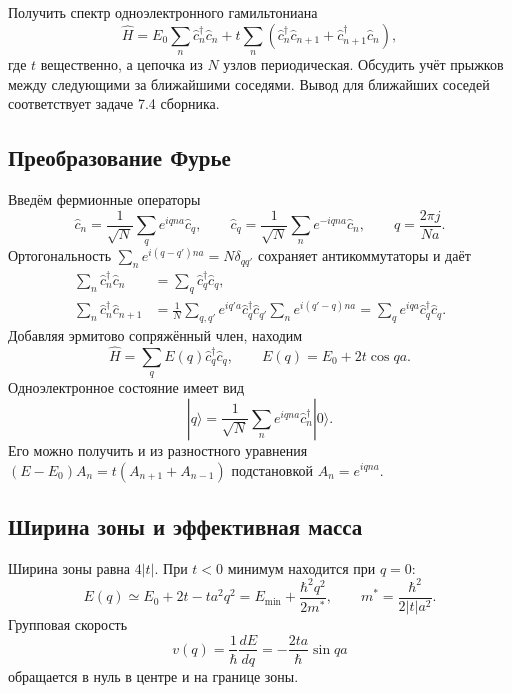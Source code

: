 \documentclass[../final.tex]{subfiles}
\begin{document}
\begingroup
\renewcommand{\thesection}{\arabic{section}}
\label{task:fksv_tight_binding}

\condition
Получить спектр одноэлектронного гамильтониана
\[
    \hat H=E_0\sum_n\hat c_n^\dagger\hat c_n
       +t\sum_n(\hat c_n^\dagger\hat c_{n+1}
                         +\hat c_{n+1}^\dagger\hat c_n),
\]
где $t$ вещественно, а цепочка из $N$ узлов периодическая.
Обсудить учёт прыжков между следующими за ближайшими соседями.
Вывод для ближайших соседей соответствует задаче 7.4 сборника.

\solution

\subsection*{Преобразование Фурье}

Введём фермионные операторы
\[
    \hat c_n=\frac1{\sqrt N}\sum_q e^{iqna}\hat c_q,
    \qquad
    \hat c_q=\frac1{\sqrt N}\sum_n e^{-iqna}\hat c_n,
    \qquad q=\frac{2\pi j}{Na}.
\]
Ортогональность $\sum_n e^{i(q-q')na}=N\delta_{qq'}$
сохраняет антикоммутаторы и даёт
\begin{align*}
    \sum_n\hat c_n^\dagger\hat c_n
       &=\sum_q\hat c_q^\dagger\hat c_q,\\
    \sum_n\hat c_n^\dagger\hat c_{n+1}
       &=\frac1N\sum_{q,q'}e^{iq'a}
          \hat c_q^\dagger\hat c_{q'}\sum_ne^{i(q'-q)na}
         =\sum_qe^{iqa}\hat c_q^\dagger\hat c_q.
\end{align*}
Добавляя эрмитово сопряжённый член, находим
\[
    \hat H=\sum_q E(q)\hat c_q^\dagger\hat c_q,
    \qquad E(q)=E_0+2t\cos qa.
\]
Одноэлектронное состояние имеет вид
\[
    |q\rangle=\frac1{\sqrt N}\sum_n e^{iqna}\hat c_n^\dagger|0\rangle.
\]
Его можно получить и из разностного уравнения
$(E-E_0)A_n=t(A_{n+1}+A_{n-1})$ подстановкой $A_n=e^{iqna}$.

\subsection*{Ширина зоны и эффективная масса}

Ширина зоны равна $4|t|$. При $t<0$ минимум находится при $q=0$:
\[
    E(q)\simeq E_0+2t-ta^2q^2
       =E_{\min}+\frac{\hbar^2q^2}{2m^*},\qquad
    m^*=\frac{\hbar^2}{2|t|a^2}.
\]
Групповая скорость
\[
    v(q)=\frac1\hbar\frac{dE}{dq}
       =-\frac{2ta}{\hbar}\sin qa
\]
обращается в нуль в центре и на границе зоны.
\end{document}
